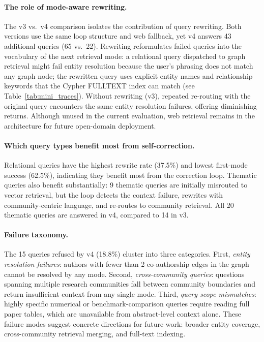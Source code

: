 \documentclass[11pt]{article}
\begin{document}
\paragraph{The role of mode-aware rewriting.}
The v3 vs.\ v4 comparison isolates the contribution of query rewriting.
Both versions use the same loop structure and web fallback, yet v4 answers
43 additional queries (65 vs.\ 22). Rewriting reformulates failed queries
into the vocabulary of the next retrieval mode: a relational query
dispatched to graph retrieval might fail entity resolution because the
user's phrasing does not match any graph node; the rewritten query uses
explicit entity names and relationship keywords that the Cypher FULLTEXT
index can match (see Table~\ref{tab:mini_traces}). Without rewriting (v3),
repeated re-routing with the original query encounters the same entity
resolution failures, offering diminishing returns. Although unused in the
current evaluation, web retrieval remains in the architecture for future
open-domain deployment.

\paragraph{Which query types benefit most from self-correction.}
Relational queries have the highest rewrite rate (37.5\%) and lowest
first-mode success (62.5\%), indicating they benefit most from the
correction loop. Thematic queries also benefit substantially: 9 thematic
queries are initially misrouted to vector retrieval, but the loop detects
the context failure, rewrites with community-centric language, and
re-routes to community retrieval. All 20 thematic queries are answered in
v4, compared to 14 in v3.

\paragraph{Failure taxonomy.}
The 15 queries refused by v4 (18.8\%) cluster into three categories.
First, \textit{entity resolution failures}: authors with fewer than 2
co-authorship edges in the graph cannot be resolved by any mode.
Second, \textit{cross-community queries}: questions spanning multiple
research communities fall between community boundaries and return
insufficient context from any single mode. Third, \textit{query scope
mismatches}: highly specific numerical or benchmark-comparison queries
require reading full paper tables, which are unavailable from abstract-level
context alone. These failure modes suggest concrete directions for future
work: broader entity coverage, cross-community retrieval merging, and
full-text indexing.
\end{document}
